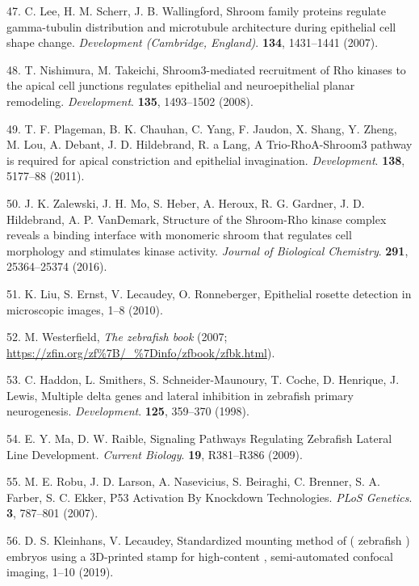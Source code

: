 \documentclass[11pt,singlespacinge,twoside]{reedthesis} %
\theoremstyle{definition}
\theoremstyle{definition}
\theoremstyle{definition}
\theoremstyle{remark}
\begin{document}
\leavevmode\hypertarget{ref-Lee2007}{}%
47. C. Lee, H. M. Scherr, J. B. Wallingford, Shroom family proteins regulate gamma-tubulin distribution and microtubule architecture during epithelial cell shape change. \emph{Development (Cambridge, England)}. \textbf{134}, 1431--1441 (2007).

\leavevmode\hypertarget{ref-Nishimura2008}{}%
48. T. Nishimura, M. Takeichi, Shroom3-mediated recruitment of Rho kinases to the apical cell junctions regulates epithelial and neuroepithelial planar remodeling. \emph{Development}. \textbf{135}, 1493--1502 (2008).

\leavevmode\hypertarget{ref-Plageman2011}{}%
49. T. F. Plageman, B. K. Chauhan, C. Yang, F. Jaudon, X. Shang, Y. Zheng, M. Lou, A. Debant, J. D. Hildebrand, R. a Lang, A Trio-RhoA-Shroom3 pathway is required for apical constriction and epithelial invagination. \emph{Development}. \textbf{138}, 5177--88 (2011).

\leavevmode\hypertarget{ref-Zalewski2016}{}%
50. J. K. Zalewski, J. H. Mo, S. Heber, A. Heroux, R. G. Gardner, J. D. Hildebrand, A. P. VanDemark, Structure of the Shroom-Rho kinase complex reveals a binding interface with monomeric shroom that regulates cell morphology and stimulates kinase activity. \emph{Journal of Biological Chemistry}. \textbf{291}, 25364--25374 (2016).

\leavevmode\hypertarget{ref-Liu}{}%
51. K. Liu, S. Ernst, V. Lecaudey, O. Ronneberger, Epithelial rosette detection in microscopic images, 1--8 (2010).

\leavevmode\hypertarget{ref-Westerfield2007}{}%
52. M. Westerfield, \emph{The zebrafish book} (2007; \url{https://zfin.org/zf\%7B/_\%7Dinfo/zfbook/zfbk.html}).

\leavevmode\hypertarget{ref-Haddon1998}{}%
53. C. Haddon, L. Smithers, S. Schneider-Maunoury, T. Coche, D. Henrique, J. Lewis, Multiple delta genes and lateral inhibition in zebrafish primary neurogenesis. \emph{Development}. \textbf{125}, 359--370 (1998).

\leavevmode\hypertarget{ref-Ma2009}{}%
54. E. Y. Ma, D. W. Raible, Signaling Pathways Regulating Zebrafish Lateral Line Development. \emph{Current Biology}. \textbf{19}, R381--R386 (2009).

\leavevmode\hypertarget{ref-Robu2007}{}%
55. M. E. Robu, J. D. Larson, A. Nasevicius, S. Beiraghi, C. Brenner, S. A. Farber, S. C. Ekker, P53 Activation By Knockdown Technologies. \emph{PLoS Genetics}. \textbf{3}, 787--801 (2007).

\leavevmode\hypertarget{ref-Kleinhans2019}{}%
56. D. S. Kleinhans, V. Lecaudey, Standardized mounting method of ( zebrafish ) embryos using a 3D-printed stamp for high-content , semi-automated confocal imaging, 1--10 (2019).
\end{document}
